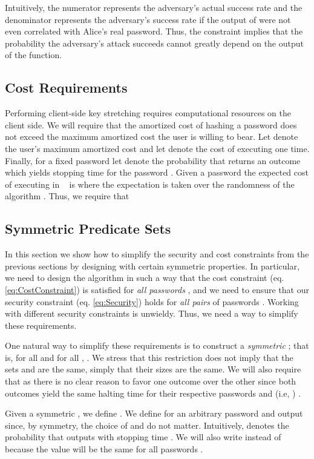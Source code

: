Intuitively, the numerator represents the adversary's actual success rate and the denominator represents the adversary's success rate if the output of  were not even correlated with Alice's real password. Thus, the constraint implies that the probability the adversary's attack succeeds cannot greatly depend on the output of the  function. 

\subsection{Cost Requirements}
Performing client-side key stretching requires computational resources on the client side. We will require that the amortized cost of hashing a password does not exceed the maximum amortized cost the user is willing to bear. Let  denote the user's maximum amortized cost and let  denote the cost of executing  one time. Finally, for a fixed password  let  denote the probability that  returns an outcome  which yields stopping time   for the password . Given a password  the expected cost of executing  in \clientcash~ is 
 where the expectation is taken over the randomness of the algorithm .  Thus, we require that 
 

\subsection{Symmetric Predicate Sets}
In this section we show how to simplify the security and cost constraints from the previous sections by designing  with certain symmetric properties. In particular, we need to design the  algorithm in such a way that the cost constraint (eq. \ref{eq:CostConstraint}) is satisfied for 
{\em all passwords} , and we need to ensure that our security constraint (eq. \ref{eq:Security}) holds for {\em all pairs} of passwords . Working with  different security constraints is unwieldy. Thus, we need a way to simplify these requirements. 

 One natural way to simplify these requirements is to construct a \textit{symmetric} ; that is, for all  and for all , . We stress that this restriction does not imply that the sets  and  are the same, simply that their sizes are the same. We will also require that 
  as there is no clear reason to favor one outcome over the other since both outcomes  yield the same halting time for their respective passwords  and  (i.e, ) . 

 Given a symmetric , we define . We define  for an arbitrary password  and output  since, by symmetry, the choice of  and  do not matter. Intuitively,  denotes the probability that  outputs  with stopping time . We will also write  instead of  because the value will be the same for all passwords .


